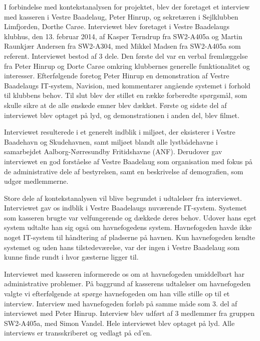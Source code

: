
I forbindelse med kontekstanalysen for projektet, blev der foretaget et interview med kasseren i Vestre Baadelaug, Peter Hinrup, og sekretæren i Sejlklubben Limfjorden, Dorthe Carøe. Interviewet blev foretaget i Vestre Baadelaugs klubhus, den 13. februar 2014, af Kasper Terndrup fra SW2-A405a og Martin Raunkjær Andersen fra SW2-A304, med Mikkel Madsen fra SW2-A405a som referent. Interviewet bestod af 3 dele. Den første del var en verbal fremlæggelse fra Peter Hinrup og Dorte Carøe omkring klubbernes generelle funktionalitet og interesser. Efterfølgende foretog Peter Hinrup en demonstration af Vestre Baadelaugs IT-system, Navision, med kommentarer angående systemet i forhold til klubbens behov. Til slut blev der stillet en række forberedte spørgsmål, som skulle sikre at de alle ønskede emner blev dækket. Første og sidste del af interviewet blev optaget på lyd, og demonstrationen i anden del, blev filmet.

Interviewet resulterede i et generelt indblik i miljøet, der eksisterer i Vestre Baadehavn og Skudehavnen, samt miljøet blandt alle lystbådehavne i samarbejdet Aalborg-Nørresundby Fritidshavne (ANF). Derudover gav interviewet en god forståelse af Vestre Baadelaug som organisation med fokus på de administrative dele af bestyrelsen, samt en beskrivelse af demografien, som udgør medlemmerne.

Store dele af kontekstanalysen vil blive begrundet i udtalelser fra interviewet. Interviewet gav os indblik i Vestre Baadelaugs nuværende IT-system. Systemet som kasseren brugte var velfungerende og dækkede deres behov. Udover hans eget system udtalte han sig også om havnefogedens system. Havnefogeden havde ikke noget IT-system til håndtering af pladserne på havnen. Kun havnefogeden kendte systemet og uden hans tilstedeværelse, var der ingen i Vestre Baadelaug som kunne finde rundt i hvor gæsterne ligger til. 

Interviewet med kasseren informerede os om at havnefogeden umiddelbart har administrative problemer. På baggrund af kasserens udtalelser om havnefogeden valgte vi efterfølgende at spørge havnefogeden om han ville stille op til et interview.
Interview med havnefogeden forløb på samme måde som 3. del af interviewet med Peter Hinrup. Interview blev udført af 3 medlemmer fra gruppen SW2-A405a, med Simon Vandel. Hele interviewet blev optaget på lyd. Alle interviews er transskriberet og vedlagt på cd'en. 
